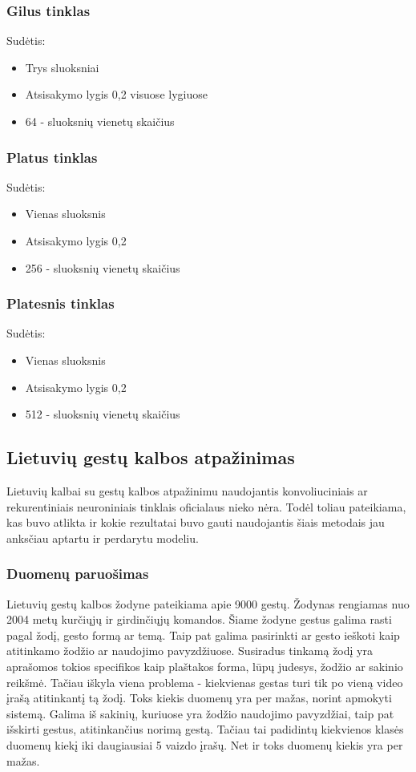 \documentclass{VUMIFPSbakalaurinis}
\begin{document}
\subsubsection{Gilus tinklas}
Sudėtis:
\begin{itemize}
	\item Trys sluoksniai
	\item Atsisakymo lygis 0,2 visuose lygiuose
	\item 64 - sluoksnių vienetų skaičius
\end{itemize}

\subsubsection{Platus tinklas}
Sudėtis:
\begin{itemize}
	\item Vienas sluoksnis
	\item Atsisakymo lygis 0,2
	\item 256 - sluoksnių vienetų skaičius
\end{itemize}

\subsubsection{Platesnis tinklas}
Sudėtis:
\begin{itemize}
	\item Vienas sluoksnis
	\item Atsisakymo lygis 0,2
	\item 512 - sluoksnių vienetų skaičius
\end{itemize}

\subsection{Lietuvių gestų kalbos atpažinimas}

Lietuvių kalbai su gestų kalbos atpažinimu naudojantis konvoliuciniais ar rekurentiniais neuroniniais tinklais oficialaus nieko nėra. Todėl toliau pateikiama, kas buvo atlikta ir kokie rezultatai buvo gauti naudojantis šiais metodais jau anksčiau aptartu ir perdarytu modeliu. 

\subsubsection{Duomenų paruošimas}
Lietuvių gestų kalbos žodyne pateikiama apie 9000 gestų. Žodynas rengiamas nuo 2004 metų kurčiųjų ir girdinčiųjų komandos. Šiame žodyne gestus galima rasti pagal žodį, gesto formą ar temą. Taip pat galima pasirinkti ar gesto ieškoti kaip atitinkamo žodžio ar naudojimo pavyzdžiuose. Susiradus tinkamą žodį yra aprašomos tokios specifikos kaip plaštakos forma, lūpų judesys, žodžio ar sakinio reikšmė. Tačiau iškyla viena problema - kiekvienas gestas turi tik po vieną video įrašą atitinkantį tą žodį. Toks kiekis duomenų yra per mažas, norint apmokyti sistemą. Galima iš sakinių, kuriuose yra žodžio naudojimo pavyzdžiai, taip pat išskirti gestus, atitinkančius norimą gestą. Tačiau tai padidintų kiekvienos klasės duomenų kiekį iki daugiausiai 5 vaizdo įrašų. Net ir toks duomenų kiekis yra per mažas.
\end{document}
